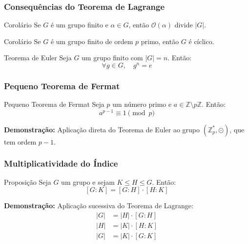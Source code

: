 \documentclass{beamer}
\begin{document}
\begin{frame}
\frametitle{Consequências do Teorema de Lagrange}

\begin{exampleblock}{Corolário}
Se $G$ é um grupo finito e $\alpha \in G$, então $\mathcal{O}(\alpha)$ divide $|G|$.
\end{exampleblock}

\pause

\begin{exampleblock}{Corolário}
Se $G$ é um grupo finito de ordem $p$ primo, então $G$ é cíclico.
\end{exampleblock}

\pause

\begin{alertblock}{Teorema de Euler}
Seja $G$ um grupo finito com $|G| = n$. Então:
\[
\forall g \in G, \quad g^n = e
\]
\end{alertblock}

\end{frame}

\begin{frame}
\frametitle{Pequeno Teorema de Fermat}

\begin{alertblock}{Pequeno Teorema de Fermat}
Seja $p$ um número primo e $a \in \mathbb{Z} \setminus p\mathbb{Z}$. Então:
\[
a^{p-1} \equiv 1 \pmod{p}
\]
\end{alertblock}

\pause

\textbf{Demonstração:} Aplicação direta do Teorema de Euler ao grupo $(\mathbb{Z}_p^*, \odot)$, que tem ordem $p-1$.

\end{frame}

\begin{frame}
\frametitle{Multiplicatividade do Índice}

\begin{exampleblock}{Proposição}
Seja $G$ um grupo e sejam $K \leq H \leq G$. Então:
\[
[G:K] = [G:H] \cdot [H:K]
\]
\end{exampleblock}

\pause

\textbf{Demonstração:} Aplicação sucessiva do Teorema de Lagrange:
\begin{align}
|G| &= |H| \cdot [G:H] \\
|H| &= |K| \cdot [H:K] \\
|G| &= |K| \cdot [G:K]
\end{align}

\end{frame}
\end{document}
